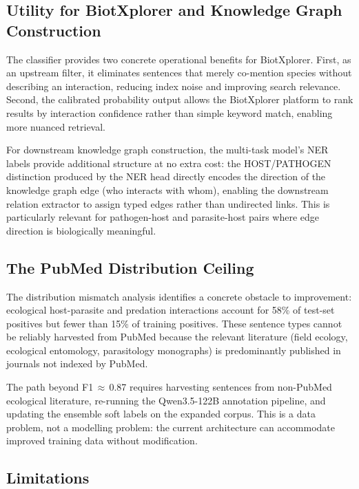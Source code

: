 \documentclass[12pt,a4paper]{article}
\begin{document}
\subsection{Utility for BiotXplorer and Knowledge Graph Construction}

The classifier provides two concrete operational benefits for BiotXplorer.
First, as an upstream filter, it eliminates sentences that merely co-mention
species without describing an interaction, reducing index noise and improving
search relevance. Second, the calibrated probability output allows the
BiotXplorer platform to rank results by interaction confidence rather than
simple keyword match, enabling more nuanced retrieval.

For downstream knowledge graph construction, the multi-task model's NER
labels provide additional structure at no extra cost: the HOST/PATHOGEN
distinction produced by the NER head directly encodes the direction of the
knowledge graph edge (who interacts with whom), enabling the downstream
relation extractor to assign typed edges rather than undirected links.
This is particularly relevant for pathogen-host and parasite-host pairs
where edge direction is biologically meaningful.

\subsection{The PubMed Distribution Ceiling}

The distribution mismatch analysis identifies a concrete obstacle to
improvement: ecological host-parasite and predation interactions account
for 58\% of test-set positives but fewer than 15\% of training positives.
These sentence types cannot be reliably harvested from PubMed because the
relevant literature (field ecology, ecological entomology, parasitology
monographs) is predominantly published in journals not indexed by PubMed.

The path beyond F1\,$\approx$\,0.87 requires harvesting sentences from
non-PubMed ecological literature, re-running the Qwen3.5-122B annotation
pipeline, and updating the ensemble soft labels on the expanded corpus.
This is a data problem, not a modelling problem: the current architecture
can accommodate improved training data without modification.

\subsection{Limitations}
\end{document}
